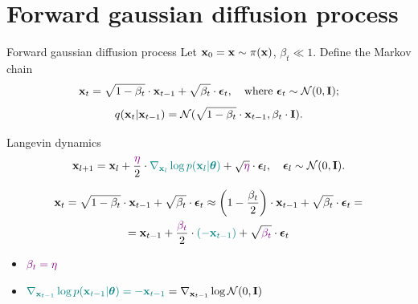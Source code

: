 \section{Forward gaussian diffusion process}
\begin{frame}{Forward gaussian diffusion process}
	Let $\mathbf{x}_0 = \mathbf{x} \sim \pi(\mathbf{x})$, $\beta_t \ll 1$. Define the Markov chain
	\[
		\mathbf{x}_t = \sqrt{1 - \beta_t} \cdot \mathbf{x}_{t - 1} + \sqrt{\beta_t} \cdot \boldsymbol{\epsilon}_t, \quad \text{where }\boldsymbol{\epsilon}_t \sim \mathcal{N}(0, \mathbf{I});
	\]
	\[
		q(\mathbf{x}_t | \mathbf{x}_{t-1}) = \mathcal{N}(\sqrt{1 - \beta_t} \cdot \mathbf{x}_{t-1}, \beta_t \cdot \mathbf{I}).
	\]
	\vspace{-0.5cm}
	\begin{block}{Langevin dynamics}
		\vspace{-0.3cm}
		\[
			\mathbf{x}_{l + 1} = \mathbf{x}_l + \frac{\color{violet} \eta}{2} \cdot {\color{teal}\nabla_{\mathbf{x}_l} \log p(\mathbf{x}_l | \boldsymbol{\theta})} + \sqrt{\color{violet} \eta} \cdot \boldsymbol{\epsilon}_l, \quad \boldsymbol{\epsilon}_l \sim \mathcal{N}(0, \mathbf{I}).
		\]
		\vspace{-0.5cm}
	\end{block}
	\vspace{-0.7cm}
	\begin{multline*}
		\mathbf{x}_t = \sqrt{1 - \beta_t} \cdot \mathbf{x}_{t - 1} + \sqrt{\beta_t} \cdot \boldsymbol{\epsilon}_t \approx \left(1 - \frac{\beta_t}{2}\right) \cdot \mathbf{x}_{t - 1} + \sqrt{\beta_t} \cdot \boldsymbol{\epsilon}_t = \\ =  \mathbf{x}_{t - 1} + \frac{ \color{violet}  \beta_t}{2} \cdot  {\color{teal} (-\mathbf{x}_{t - 1})} + \sqrt{ \color{violet}  \beta_t} \cdot \boldsymbol{\epsilon}_t
	\end{multline*}
	\vspace{-1.0cm}
	\begin{itemize}
		\item ${\color{violet} \beta_t = \eta}$
		\item ${\color{teal} \nabla_{\mathbf{x}_{t-1}}\log p(\mathbf{x}_{t-1} | \boldsymbol{\theta}) = - \mathbf{x}_{t-1}} = \nabla_{\mathbf{x}_{t-1}} \log \mathcal{N}(0, \mathbf{I})$
	\end{itemize}
 \end{frame}
